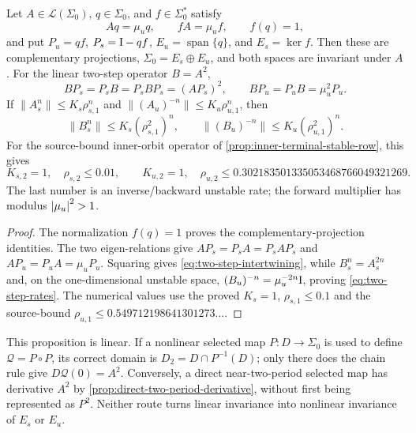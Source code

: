 \begin{proposition}
\label{prop:inner-two-step-splitting}
Let \(A\in\mathcal L(\Sigma_0)\), \(q\in\Sigma_0\), and
\(f\in\Sigma_0^*\) satisfy
\[
 Aq=\mu_uq,\qquad fA=\mu_uf,\qquad f(q)=1,
\]
and put \(P_u=qf\), \(P_s=\mathrm I-qf\), \(E_u=\operatorname{span}\{q\}\),
and \(E_s=\ker f\).  Then these are complementary projections,
\(\Sigma_0=E_s\oplus E_u\), and both spaces are invariant under \(A\).
For the linear two-step operator \(B=A^2\),
\begin{equation}
 BP_s=P_sB=P_sBP_s=(AP_s)^2,
 \qquad BP_u=P_uB=\mu_u^2P_u.                         \label{eq:two-step-intertwining}
\end{equation}
If
\(\|A_s^n\|\le K_s\rho_{s,1}^n\)
and
\(\|(A_u)^{-n}\|\le K_u\rho_{u,1}^n\), then
\begin{equation}
 \|B_s^n\|\le K_s(\rho_{s,1}^2)^n,
 \qquad
 \|(B_u)^{-n}\|\le K_u(\rho_{u,1}^2)^n.              \label{eq:two-step-rates}
\end{equation}
For the source-bound inner-orbit operator of
\cref{prop:inner-terminal-stable-row}, this gives
\begin{equation}
 K_{s,2}=1,\quad \rho_{s,2}\le0.01,
 \qquad
 K_{u,2}=1,\quad
 \rho_{u,2}\le
 0.302183501335053468766049321269.                    \label{eq:model-two-step-rates}
\end{equation}
The last number is an inverse/backward unstable rate; the forward multiplier
has modulus \(\left\lvert\mu_u\right\rvert^2>1\).
\end{proposition}

\begin{proof}
The normalization \(f(q)=1\) proves the complementary-projection identities.
The two eigen-relations give
\(AP_s=P_sA=P_sAP_s\) and \(AP_u=P_uA=\mu_uP_u\).
Squaring gives \cref{eq:two-step-intertwining}, while
\(B_s^n=A_s^{2n}\) and, on the one-dimensional unstable space,
\((B_u)^{-n}=\mu_u^{-2n}\mathrm I\), proving
\cref{eq:two-step-rates}.  The numerical values use the proved
\(K_s=1\), \(\rho_{s,1}\le0.1\) and the source-bound
\(\rho_{u,1}\le0.549712198641301273\ldots\).
\end{proof}

This proposition is linear.  If a nonlinear selected map
\(P:D\to\Sigma_0\) is used to define \(\mathcal Q=P\circ P\), its correct
domain is \(D_2=D\cap P^{-1}(D)\); only there does the chain rule give
\(D\mathcal Q(0)=A^2\).  Conversely, a direct near-two-period selected map
has derivative \(A^2\) by \cref{prop:direct-two-period-derivative}, without
first being represented as \(P^2\).  Neither route turns
linear invariance into nonlinear invariance of \(E_s\) or \(E_u\).

